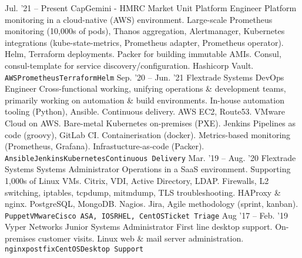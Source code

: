 \documentclass[9pt]{developercv} %
\begin{document}
\begin{entrylist}
  \entry
    {Jul. '21 -- Present}
    {CapGemini - HMRC Market Unit}
    {Platform Engineer}
    {Platform monitoring in a cloud-native (AWS) environment. Large-scale Prometheus monitoring (10,000s of pods), Thanos aggregation, Alertmanager, Kubernetes \linebreak integrations (kube-state-metrics, Prometheus adapter, Prometheus \linebreak operator). Helm, Terraform deployments. Packer for building immutable AMIs.  \linebreak Consul, consul-template for service discovery/configuration. Hashicorp Vault.\\ \texttt{AWS}\slashsep\texttt{Prometheus}\slashsep\texttt{Terraform}\slashsep\texttt{Helm}}
	\entry
		{Sep. '20 -- Jun. '21}
		{Flextrade Systems}
		{DevOps Engineer}
    {Cross-functional working, unifying operations \& development teams, primarily working \linebreak on automation \& build environments. In-house automation tooling (Python), \linebreak Ansible. Continuous delivery. AWS EC2, Route53. VMware Cloud on AWS. Bare-metal \linebreak Kubernetes on-premises (PXE). Jenkins Pipelines as code (groovy), GitLab CI. \linebreak Containerisation (docker). Metrics-based monitoring (Prometheus, Grafana). Infrastucture-as-code (Packer).\\ \texttt{Ansible}\slashsep\texttt{Jenkins}\slashsep\texttt{Kubernetes}\slashsep\texttt{Continuous Delivery}}
	\entry
		{Mar. '19 -- Aug. '20}
		{Flextrade Systems}
		{Systems Administrator}
    {Operations in a SaaS environment. Supporting 1,000s of Linux VMs. Citrix, VDI, \linebreak Active Directory, LDAP. Firewalls, L2 switching, iptables, tcpdump, mitmdump, \linebreak TLS troubleshooting. HAProxy \& nginx. PostgreSQL, MongoDB. Nagios. Jira, Agile methodology (sprint, kanban).\\ \texttt{Puppet}\slashsep\texttt{VMware}\slashsep\texttt{Cisco ASA, IOS}\slashsep\texttt{RHEL, CentOS}\slashsep\texttt{Ticket Triage}}
	\entry
		{Aug '17 -- Feb. '19}
		{Vyper Networks}
		{Junior Systems Administrator}
    {First line desktop support. On-premises customer visits. Linux web \& mail server \linebreak administration.\\ \texttt{nginx}\slashsep\texttt{postfix}\slashsep\texttt{CentOS}\slashsep\texttt{Desktop Support}}
\end{entrylist}
\end{document}
